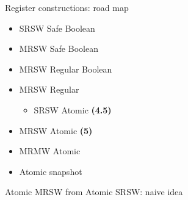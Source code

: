 \begin{frame}{Register constructions: road map}

\begin{itemize}
  \item SRSW Safe Boolean 
  \item MRSW Safe Boolean 
  \item MRSW Regular Boolean 
  \item MRSW Regular
  \begin{itemize}
    \item SRSW Atomic \textbf{(4.5)}
  \end{itemize}
  \item MRSW Atomic \textbf{(5)} 
  \item MRMW Atomic
  \item Atomic snapshot
\end{itemize}
\end{frame}


\begin{frame}[fragile]{Atomic MRSW from Atomic SRSW: naive idea}



\end{frame}



